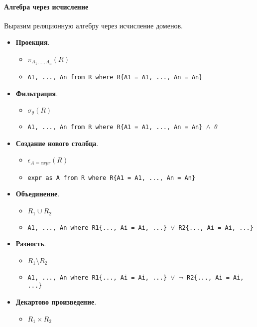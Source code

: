 \paragraph{Алгебра через исчисление}

Выразим реляционную алгебру через исчисление доменов.

\begin{itemize}
	\item \textbf{Проекция}.
	      \begin{itemize}
		      \item $\pi_{A_1, \ldots, A_n}(R)$
		      \item \texttt{A1, ..., An from R where R\{A1 = A1, ..., An = An\}}
	      \end{itemize}
	\item \textbf{Фильтрация}.
	      \begin{itemize}
		      \item $\sigma_{\theta}(R)$
		      \item \texttt{A1, ..., An from R where R\{A1 = A1, ..., An = An\} $\wedge$ $\theta$}
	      \end{itemize}
	\item \textbf{Создание нового столбца}.
	      \begin{itemize}
		      \item $\epsilon_{A=expr}(R)$
		      \item \texttt{expr as A from R where R\{A1 = A1, ..., An = An\}}
	      \end{itemize}
	\item \textbf{Объединение}.
	      \begin{itemize}
		      \item $R_1 \cup R_2$
		      \item \texttt{A1, ..., An where R1\{..., Ai = Ai, ...\} $\vee$ R2\{..., Ai = Ai, ...\}}
	      \end{itemize}
	\item \textbf{Разность}.
	      \begin{itemize}
		      \item $R_1 \setminus R_2$
		      \item \texttt{A1, ..., An where R1\{..., Ai = Ai, ...\} $\vee$ $\neg$
			            R2\{..., Ai = Ai, ...\}}
	      \end{itemize}
	\item \textbf{Декартово произведение}.
	      \begin{itemize}
		      \item $R_1 \times R_2$

\end{itemize}
\end{itemize}

